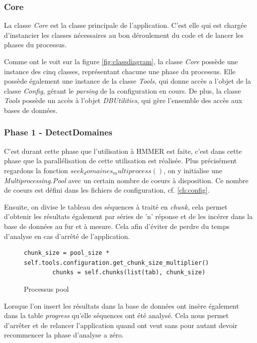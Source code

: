 \subsubsection{Core}
La classe \emph{Core} est la classe principale de l'application. C'est elle qui est chargée d'instancier les classes nécessaires au bon déroulement du code et de lancer les phases du processus.

Comme ont le voit sur la figure \ref{fig:classdiagram}, la classe \emph{Core} possède une instance des cinq classes, représentant chacune une phase du processus. Elle possède également une instance de la classe \emph{Tools}, qui donne accès a l'objet de la classe \emph{Config}, gérant le \emph{parsing} de la configuration en cours. De plus, la classe \emph{Tools} possède un accès à l'objet \emph{DBUtilities}, qui gère l'ensemble des accès aux bases de données.

\subsubsection{Phase 1 - DetectDomaines}

C'est durant cette phase que l'utilisation à HMMER est faite, c'est dans cette phase que la parallélisation de cette utilisation est réalisée. Plus précisément regardons la fonction \emph{$seek_domaines_multiprocess()$}, on y initialise une \emph{Multiprocessing.Pool} avec un certain nombre de coeurs à disposition. Ce nombre de coeurs est défini dans les fichiers de configuration, cf. \ref{ch:config}.

Ensuite, on divise le tableau des séquences à traité en \emph{chunk}, cela permet d'obtenir les résultats également par séries de 'n' réponse et de les incérer dans la base de données au fur et à mesure. Cela afin d'éviter de perdre du temps d'analyse en cas d'arrêté de l'application.

\begin{figure}[H] 
\centering 
\lstset{language=python}
\begin{lstlisting}[frame=single]
chunk_size = pool_size * self.tools.configuration.get_chunk_size_multiplier()
        chunks = self.chunks(list(tab), chunk_size)
\end{lstlisting} 
\caption[Processus pool]{Processus pool}
\label{fig:processPool} 
\end{figure}

Lorsque l'on insert les résultats dans la base de données ont insère également dans la table \emph{progress} qu'elle séquences ont été analysé. Cela nous permet d'arrêter et de relancer l'application quand ont veut sans pour autant devoir recommencer la phase d'analyse a zéro.

